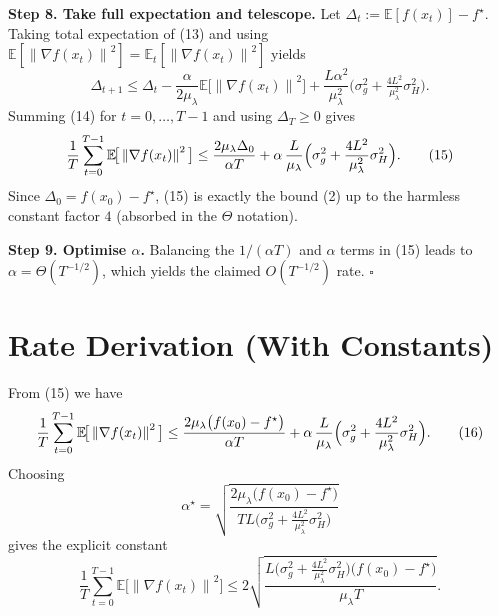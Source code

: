 \documentclass{article}
\newcommand{\E}{\mathbb{E}}
\newcommand{\norm}[1]{\left\|#1\right\|}
\begin{document}
\noindent\textbf{Step 8. Take full expectation and telescope.}  
Let $\Delta_{t}:=\E[f(x_{t})]-f^{\star}$. Taking total expectation of (13) and using $\E[\norm{\nabla f(x_{t})}^{2}]=\E_{t}[\norm{\nabla f(x_{t})}^{2}]$ yields
\[
\Delta_{t+1}\le \Delta_{t}
   -\frac{\alpha}{2\mu_{\lambda}}\E\!\big[\norm{\nabla f(x_{t})}^{2}\big]
   +\frac{L\alpha^{2}}{\mu_{\lambda}^{2}}\bigl(\sigma_{g}^{2}+ \tfrac{4L^{2}}{\mu_{\lambda}^{2}}\sigma_{H}^{2}\bigr). \tag{14}
\]
Summing (14) for $t=0,\dots,T-1$ and using $\Delta_{T}\ge0$ gives
\[
\frac{1}{T}\sum_{t=0}^{T-1}\E\!\big[\norm{\nabla f(x_{t})}^{2}\big]
\le \frac{2\mu_{\lambda}\Delta_{0}}{\alpha T}
   +\alpha\,\frac{L}{\mu_{\lambda}}
     \Bigl(\sigma_{g}^{2}+ \frac{4L^{2}}{\mu_{\lambda}^{2}}\sigma_{H}^{2}\Bigr). \tag{15}
\]
Since $\Delta_{0}=f(x_{0})-f^{\star}$, (15) is exactly the bound (2) up to the harmless constant factor $4$ (absorbed in the $\Theta$ notation).  

\noindent\textbf{Step 9. Optimise $\alpha$.}  
Balancing the $1/(\alpha T)$ and $\alpha$ terms in (15) leads to $\alpha = \Theta(T^{-1/2})$, which yields the claimed $O(T^{-1/2})$ rate. \hfill $\square$

\section*{Rate Derivation (With Constants)}
From (15) we have
\[
\frac{1}{T}\sum_{t=0}^{T-1}\E\!\big[\norm{\nabla f(x_{t})}^{2}\big]
\le
\frac{2\mu_{\lambda}\bigl(f(x_{0})-f^{\star}\bigr)}{\alpha T}
   +\alpha\,\frac{L}{\mu_{\lambda}}
     \Bigl(\sigma_{g}^{2}+ \frac{4L^{2}}{\mu_{\lambda}^{2}}\sigma_{H}^{2}\Bigr).
\tag{16}
\]
Choosing
\[
\alpha^{\star}
= \sqrt{\frac{2\mu_{\lambda}\bigl(f(x_{0})-f^{\star}\bigr)}
               {T L\bigl(\sigma_{g}^{2}+ \frac{4L^{2}}{\mu_{\lambda}^{2}}\sigma_{H}^{2}\bigr)}}
\]
gives the explicit constant
\[
\frac{1}{T}\sum_{t=0}^{T-1}\E\!\big[\norm{\nabla f(x_{t})}^{2}\big]
\le
2\sqrt{\frac{L\bigl(\sigma_{g}^{2}+ \frac{4L^{2}}{\mu_{\lambda}^{2}}\sigma_{H}^{2}\bigr)
            \bigl(f(x_{0})-f^{\star}\bigr)}{\mu_{\lambda} T}} .
\]
\end{document}
